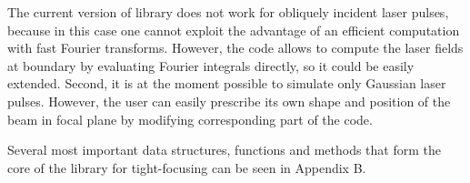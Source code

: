 The current version of library does not work for obliquely incident laser pulses, because in this case one cannot exploit the advantage of an efficient computation with fast Fourier transforms. However, the code allows to compute the laser fields at boundary by evaluating Fourier integrals directly, so it could be easily extended. Second, it is at the moment possible to simulate only Gaussian laser pulses. However, the user can easily prescribe its own shape and position of the beam in focal plane by modifying corresponding part of the code.

Several most important data structures, functions and methods that form the core of the library for tight-focusing can be seen in Appendix B.